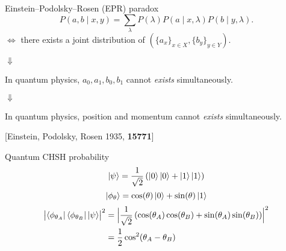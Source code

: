 \documentclass{beamer}
\newcommand\emm[1]{\textcolor{redorange}{{#1}}}
\newcommand\numc[1]{\textcolor{citation}{{\bf #1}}}
\begin{document}
\begin{frame}{Einstein--Podolsky--Rosen (EPR) paradox}
\begin{equation*}
P(a, b\mid x,y) = \sum_{\lambda} P(\lambda) P(a\mid x, \lambda) P(b\mid y,\lambda).
\end{equation*}
$\iff$
there exists a joint distribution of $(\{a_x\}_{x\in X}, \{b_y\}_{y\in Y})$.

\begin{center}
\Large
$\Downarrow$

\vspace{1.0em}
\normalsize
In quantum physics,
$a_0,a_1,b_0,b_1$ \emm{cannot \textit{exists}} simultaneously.

\vspace{1.0em}
\Large
$\Downarrow$

\vspace{1.0em}
\normalsize
In quantum physics,
position and momentum \emm{cannot \textit{exists}} simultaneously.
\end{center}

[Einstein, Podolsky, Rosen 1935, \numc{15771}]
\end{frame}

\begin{frame}{Quantum CHSH probability}
\begin{equation*}
\ket{\psi} = \frac1{\sqrt{2}}\left(\ket{0}\ket{0} + \ket{1}\ket{1}\right)
\end{equation*}
\begin{equation*}
\ket{\phi_\theta} = \cos(\theta) \ket{0} + \sin(\theta) \ket{1}
\end{equation*}
\begin{align*}
\bigl|\bra{\phi_{\theta_A}}\bra{\phi_{\theta_B}}\ket{\psi}\bigr|^2
&=\Bigl|\frac1{\sqrt{2}}\left(\cos(\theta_A)\cos(\theta_B) + \sin(\theta_A)\sin(\theta_B)\right)\Bigr|^2\\
&=\frac12\cos^2(\theta_A-\theta_B)
\end{align*}
\end{frame}
\end{document}
